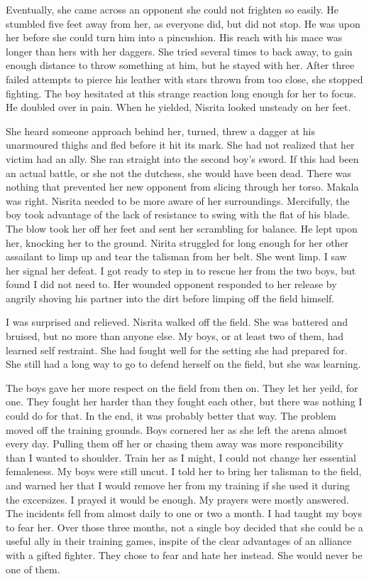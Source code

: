 \documentclass{article}
\begin{document}
Eventually, she came across an opponent she could not frighten so easily. He stumbled five feet away from her, as everyone did, but did not stop. He was upon her before she could turn him into a pincushion. His reach with his mace was longer than hers with her daggers. She tried several times to back away, to gain enough distance to throw something at him, but he stayed with her. After three failed attempts to pierce his leather with stars thrown from too close, she stopped fighting. The boy hesitated at this strange reaction long enough for her to focus. He doubled over in pain. When he yielded, Nisrita looked unsteady on her feet.

She heard someone approach behind her, turned, threw a dagger at his unarmoured thighs and fled before it hit its mark. She had not realized that her victim had an ally. She ran straight into the second boy's sword. If this had been an actual battle, or she not the dutchess, she would have been dead. There was nothing that prevented her new opponent from slicing through her torso. Makala was right. Nisrita needed to be more aware of her surroundings. Mercifully, the boy took advantage of the lack of resistance to swing with the flat of his blade. The blow took her off her feet and sent her scrambling for balance. He lept upon her, knocking her to the ground. Nirita struggled for long enough for her other assailant to limp up and tear the talisman from her belt. She went limp. I saw her signal her defeat. I got ready to step in to rescue her from the two boys, but found I did not need to. Her wounded opponent responded to her release by angrily shoving his partner into the dirt before limping off the field himself.

I was surprised and relieved. Nisrita walked off the field. She was battered and bruised, but no more than anyone else. My boys, or at least two of them, had learned self restraint. She had fought well for the setting she had prepared for. She still had a long way to go to defend herself on the field, but she was learning.

The boys gave her more respect on the field from then on. They let her yeild, for one. They fought her harder than they fought each other, but there was nothing I could do for that. In the end, it was probably better that way. The problem moved off the training grounds. Boys cornered her as she left the arena almost every day. Pulling them off her or chasing them away was more responcibility than I wanted to shoulder. Train her as I might, I could not change her essential femaleness. My boys were still uncut. I told her to bring her talisman to the field, and warned her that I would remove her from my training if she used it during the excersizes. I prayed it would be enough. My prayers were mostly answered. The incidents fell from almost daily to one or two a month. I had taught my boys to fear her. Over those three months, not a single boy decided that she could be a useful ally in their training games, inspite of the clear advantages of an alliance with a gifted fighter. They chose to fear and hate her instead. She would never be one of them.
\end{document}
